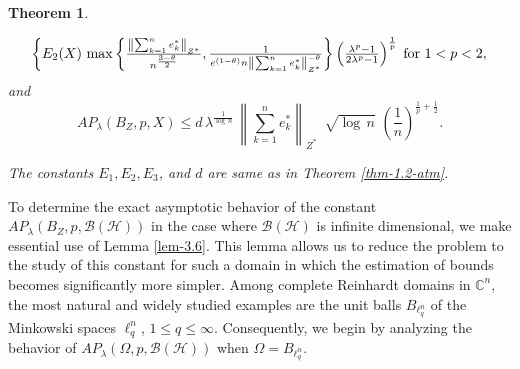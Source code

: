 \documentclass[a4paper,11pt, reqno]{amsart}
\newtheorem{thm}{Theorem}[section]
\theoremstyle{definition}
\newcommand{\norm}[1]{\left\lVert#1\right\rVert}
\begin{document}
\begin{thm}
\begin{enumerate}
\begin{equation*}
\begin{cases}
				E_{2}(X)\,  \max \left\{\frac{\norm{\sum_{k=1}^{n}e^{*}_{k}}_{Z^{*}}}{n^{\frac{3-\theta}{2}}},  \frac{1}{e^{(1-\theta)}n \norm{\sum_{k=1}^{n}e^{*}_{k}}_{Z^{*}}^{-\theta}}\right\}\left(\frac{\lambda^p -1}{2\lambda^p - 1}\right)^{\frac{1}{p}} \hspace{-2mm} & \text{for $1<p< 2$}, 
			\end{cases}
		\end{equation*}
		and 
		$$AP_{\lambda}(B_{Z}, p,X) \leq d\,  \lambda^{\frac{1}{\log\,n}}\, \norm{\sum_{k=1}^{n}e^{*}_{k}}_{Z^{*}}\,\,\, \sqrt{\log \, n}\,\, \left(\frac{1}{n}\right)^{\frac{1}{p}+\frac{1}{2}}.
		$$
	\end{enumerate}
	The constants $E_{1}, E_{2}, E_{3}$, and $d$ are same as in Theorem \ref{thm-1.2-atm}.
\end{thm}
To determine the exact asymptotic behavior of the constant $AP_{\lambda}(B_{Z}, p,\mathcal{B}(\mathcal{H}))$ in the case where $\mathcal{B}(\mathcal{H})$ is infinite dimensional, we make essential use of Lemma \ref{lem-3.6}. This lemma allows us to reduce the problem to the study of this constant for such a domain in which the estimation of bounds becomes significantly more simpler. Among complete Reinhardt domains in $\mathbb{C}^n$, the most natural and widely studied examples are the unit balls $B_{\ell^n _q}$ of the Minkowski spaces $\ell^n _q$, $1\leq q \leq \infty$. Consequently, we begin by analyzing the behavior of $AP_{\lambda}(\Omega, p,\mathcal{B}(\mathcal{H}))$ when $\Omega=B_{\ell^n _q}$. 
\end{document}
